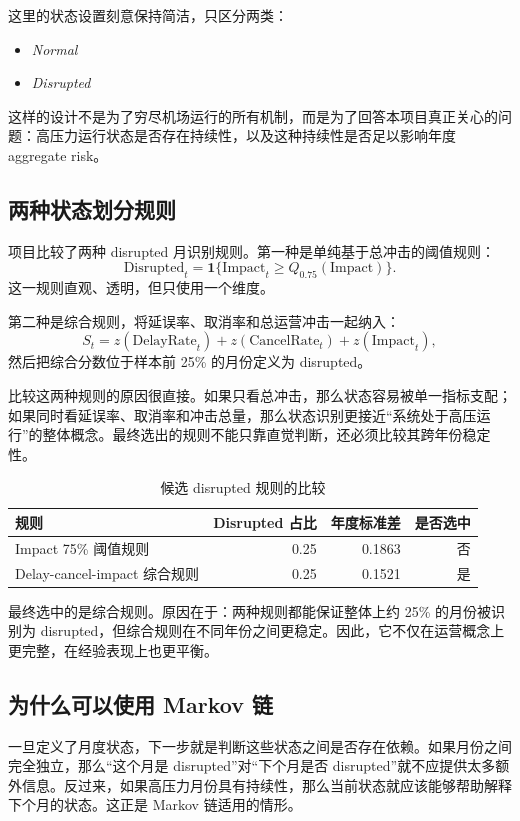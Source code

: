 \documentclass[UTF8,fontset=fandol,11pt]{ctexart}
\begin{document}
这里的状态设置刻意保持简洁，只区分两类：
\begin{itemize}
  \item \textit{Normal}
  \item \textit{Disrupted}
\end{itemize}
这样的设计不是为了穷尽机场运行的所有机制，而是为了回答本项目真正关心的问题：高压力运行状态是否存在持续性，以及这种持续性是否足以影响年度 aggregate risk。

\subsection{两种状态划分规则}
项目比较了两种 disrupted 月识别规则。第一种是单纯基于总冲击的阈值规则：
\[
\text{Disrupted}_t = \mathbf{1}\{ \text{Impact}_t \ge Q_{0.75}(\text{Impact}) \}.
\]
这一规则直观、透明，但只使用一个维度。

第二种是综合规则，将延误率、取消率和总运营冲击一起纳入：
\[
S_t = z(\text{DelayRate}_t) + z(\text{CancelRate}_t) + z(\text{Impact}_t),
\]
然后把综合分数位于样本前 25\% 的月份定义为 disrupted。

比较这两种规则的原因很直接。如果只看总冲击，那么状态容易被单一指标支配；如果同时看延误率、取消率和冲击总量，那么状态识别更接近“系统处于高压运行”的整体概念。最终选出的规则不能只靠直觉判断，还必须比较其跨年份稳定性。

\begin{table}[H]
\centering
\caption{候选 disrupted 规则的比较}
\begin{tabular}{lrrr}
\toprule
规则 & Disrupted 占比 & 年度标准差 & 是否选中 \\
\midrule
Impact 75\% 阈值规则 & 0.25 & 0.1863 & 否 \\
Delay-cancel-impact 综合规则 & 0.25 & 0.1521 & 是 \\
\bottomrule
\end{tabular}
\end{table}

最终选中的是综合规则。原因在于：两种规则都能保证整体上约 25\% 的月份被识别为 disrupted，但综合规则在不同年份之间更稳定。因此，它不仅在运营概念上更完整，在经验表现上也更平衡。

\subsection{为什么可以使用 Markov 链}
一旦定义了月度状态，下一步就是判断这些状态之间是否存在依赖。如果月份之间完全独立，那么“这个月是 disrupted”对“下个月是否 disrupted”就不应提供太多额外信息。反过来，如果高压力月份具有持续性，那么当前状态就应该能够帮助解释下个月的状态。这正是 Markov 链适用的情形。
\end{document}
